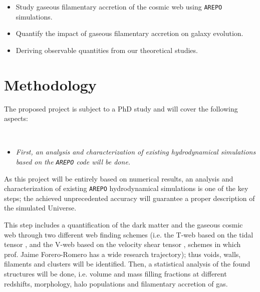 \documentclass[a4,useAMS,usenatbib,usegraphicx,12pt]{article}
\begin{document}
\begin{itemize}

\item[\checkmark] Study gaseous filamentary accretion of the cosmic web using 
\texttt{AREPO} simulations.

\item[\checkmark] Quantify the impact of gaseous filamentary accretion on galaxy 
evolution.

\item[\checkmark] Deriving observable quantities from our theoretical studies.


\end{itemize}



\section{Methodology}


The proposed project is subject to a PhD study and will cover the following 
aspects:

\

\begin{itemize}

\item[\checkmark] \textit{First, an analysis and characterization of existing 
hydrodynamical simulations based on the \texttt{AREPO} code will be done.}

\end{itemize}

As this project will be entirely based on numerical results, an analysis and 
characterization of existing \texttt{AREPO} hydrodynamical simulations is one 
of the key steps; the achieved unprecedented accuracy will guarantee a proper 
description of the simulated Universe.


This step includes a quantification of the dark matter and the gaseous cosmic
web through two different web finding schemes (i.e. the T-web based on the 
tidal tensor \citep{Hahn07,Forero09}, and the V-web based on the velocity shear
tensor \citep{Hoffman12}, schemes in which prof. Jaime Forero-Romero has a wide 
research trajectory); thus voids, walls, filaments and clusters will be 
identified. Then, a statistical analysis of the found structures will be done, 
i.e. volume and mass filling fractions at different redshifts, morphology, halo 
populations and filamentary accretion of gas.
\end{document}
